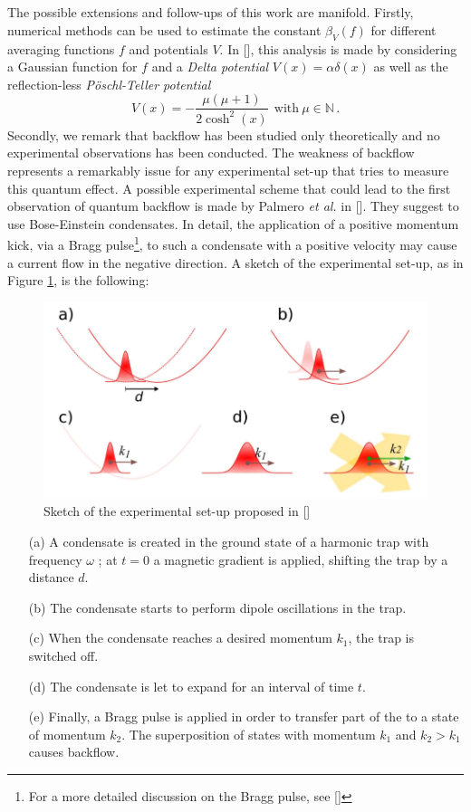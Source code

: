 \\
\\
The possible extensions and follow-ups of this work are manifold. Firstly, numerical methods can be used to estimate the constant $\beta_V(f)$ for different averaging functions $f$ and potentials $V$. In [\citealp[Sect. IV]{gand}], this analysis is made by considering a Gaussian function for $f$ and a \textit{Delta potential} $V(x)=\alpha\delta(x)$ as well as the reflection-less \textit{P\"{o}schl-Teller potential}
\begin{equation*}
	V(x)=-\frac{\mu(\mu+1)}{2\cosh^2(x)}\ \ \text{with}\ \mu\in\mathbb{N}\,.
\end{equation*}
Secondly, we remark that backflow has been studied only theoretically and no experimental observations has been conducted. The weakness of backflow represents a remarkably issue for any experimental set-up that tries to measure this quantum effect. A possible experimental scheme that could lead to the first observation
of quantum backflow is made by Palmero \textit{et al.} in [\citealp{palmero}]. They suggest to use Bose-Einstein condensates. In detail, the application of a positive momentum kick, via a Bragg pulse\footnote{For a more detailed discussion on the Bragg pulse, see [\citealp{bragg}]}, to such a condensate with
a positive velocity may cause a current flow in the negative direction. A sketch of the experimental set-up, as in Figure \ref{fig:bose}, is the following:
\begin{figure}[h!]
	\centering
	\includegraphics[scale=0.30]{images/bose}
	\caption{Sketch of the experimental set-up proposed in [\citealp{palmero}]}
	\label{fig:bose}
\end{figure}
\begin{itemize}
	\item[(a)] A condensate is created in the
	ground state of a harmonic trap with frequency $\omega$ ; at $t = 0$
	a magnetic gradient is applied, shifting the trap by a distance
	$d$.
	\item[(b)]The condensate starts to perform dipole oscillations in
	the trap.
	\item[(c)]When the condensate reaches a desired momentum $k_1$, the trap
	is switched off.
	\item[(d)]The condensate is let to expand for an interval of time $t$.
	\item[(e)]Finally, a Bragg pulse is applied in order to transfer part of the to a state of momentum $k_2$. The superposition of states with momentum $k_1$ and $k_2>k_1$ causes backflow.
\end{itemize}
